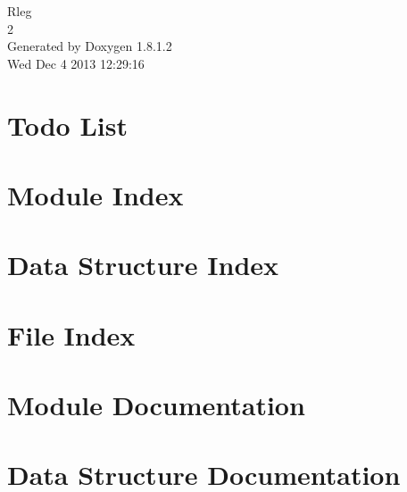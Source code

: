 \documentclass{book}
\begin{document}
\hypersetup{pageanchor=false,citecolor=blue}
\begin{titlepage}
\vspace*{7cm}
\begin{center}
{\Large Rleg \\[1ex]\large 2 }\\
\vspace*{1cm}
{\large Generated by Doxygen 1.8.1.2}\\
\vspace*{0.5cm}
{\small Wed Dec 4 2013 12:29:16}\\
\end{center}
\end{titlepage}
\clearemptydoublepage
{}
\tableofcontents
\clearemptydoublepage
{}
\hypersetup{pageanchor=true,citecolor=blue}
\chapter{Todo List}
\label{todo}
\hypertarget{todo}{}

\chapter{Module Index}

\chapter{Data Structure Index}

\chapter{File Index}

\chapter{Module Documentation}









\chapter{Data Structure Documentation}




















\end{document}
